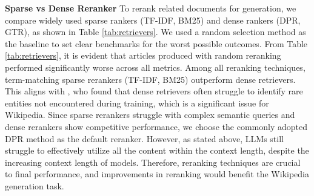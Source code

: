 \documentclass[11pt]{article}
\begin{document}
\noindent \textbf{Sparse vs Dense Reranker}
To rerank related documents for generation, we compare widely used sparse rankers (TF-IDF, BM25) and dense rankers (DPR, GTR), as shown in Table \ref{tab:retrievers}. We used a random selection method as the baseline to set clear benchmarks for the worst possible outcomes. From Table \ref{tab:retrievers}, it is evident that articles produced with random reranking performed significantly worse across all metrics. Among all reranking techniques, term-matching sparse rerankers (TF-IDF, BM25) outperform dense retrievers. This aligns with \citet{sciavolino2022simple}, who found that dense retrievers often struggle to identify rare entities not encountered during training, which is a significant issue for Wikipedia. Since sparse rerankers struggle with complex semantic queries and dense rerankers show competitive performance, we choose the commonly adopted DPR method as the default reranker. However, as stated above, LLMs still struggle to effectively utilize all the content within the context length, despite the increasing context length of models. Therefore, reranking techniques are crucial to final performance, and improvements in reranking would benefit the Wikipedia generation task.
\end{document}
